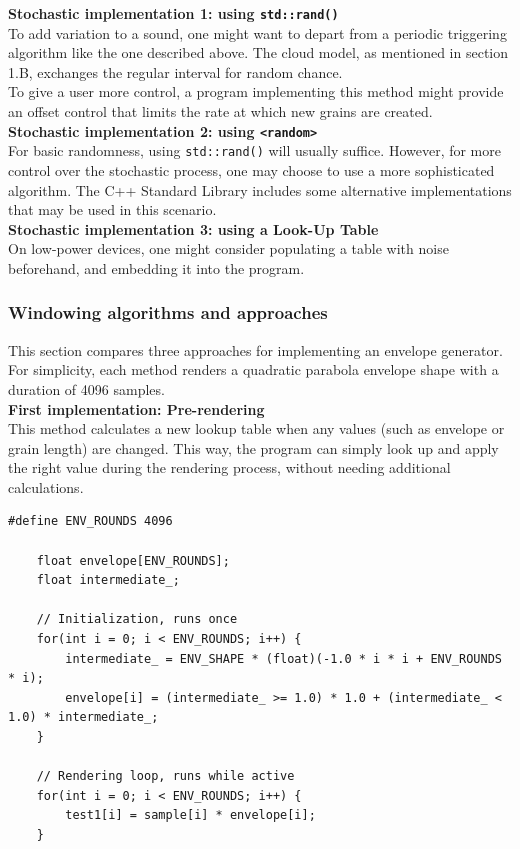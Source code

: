 \documentclass[10pt, twocolumn]{IEEEtran}
\begin{document}
\textbf{Stochastic implementation 1: using \lstinline|std::rand()|}\\
To add variation to a sound, one might want to depart from a periodic triggering algorithm like the one described above. The cloud model, as mentioned in section 1.B, exchanges the regular interval for random chance. \\
To give a user more control, a program implementing this method might provide an offset control that limits the rate at which new grains are created. \\


\textbf{Stochastic implementation 2: using \lstinline|<random>|}\\
For basic randomness, using \lstinline|std::rand()| will usually suffice. However, for more control over the stochastic process, one may choose to use a more sophisticated algorithm. The C++ Standard Library includes some alternative implementations that may be used in this scenario.\\

\textbf{Stochastic implementation 3: using a Look-Up Table}\\
On low-power devices, one might consider populating a table with noise beforehand, and embedding it into the program.\\ 

\subsubsection{Windowing algorithms and approaches}
This section compares three approaches for implementing an envelope generator. For simplicity, each method renders a quadratic parabola envelope shape with a duration of 4096 samples.  \\

\textbf{First implementation: Pre-rendering}\\
This method calculates a new lookup table when any values (such as envelope or grain length) are changed. This way, the program can simply look up and apply the right value during the rendering process, without needing additional calculations.
\begin{lstlisting}[caption={Envelope application using a pre-rendering algorithm}]
	#define ENV_ROUNDS 4096
		
	float envelope[ENV_ROUNDS];
	float intermediate_;
		
	// Initialization, runs once
	for(int i = 0; i < ENV_ROUNDS; i++) {
		intermediate_ = ENV_SHAPE * (float)(-1.0 * i * i + ENV_ROUNDS * i);
		envelope[i] = (intermediate_ >= 1.0) * 1.0 + (intermediate_ < 1.0) * intermediate_;
	}
		
	// Rendering loop, runs while active
	for(int i = 0; i < ENV_ROUNDS; i++) {
		test1[i] = sample[i] * envelope[i];
	}
\end{lstlisting}
\end{document}
